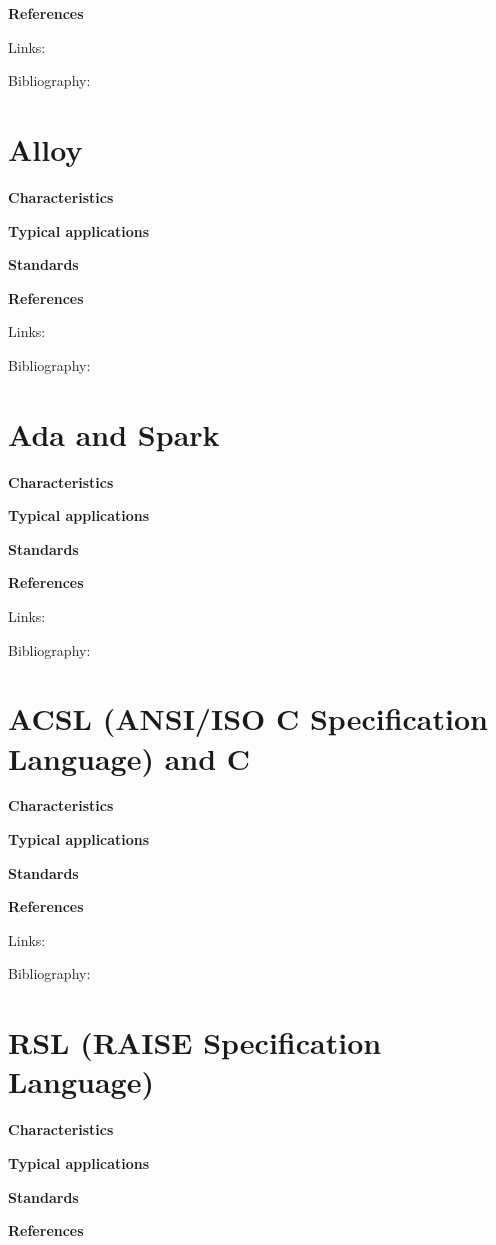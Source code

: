 \documentclass{./template/openetcs2}
\begin{document}
	\textbf{References}

Links:



Bibliography:

\section{Alloy}


	\textbf{Characteristics}


	\textbf{Typical applications}


	\textbf{Standards}


	\textbf{References}

Links:



Bibliography:

\section{Ada and Spark}


	\textbf{Characteristics}


	\textbf{Typical applications}


	\textbf{Standards}


	\textbf{References}

Links:



Bibliography:

\section{ACSL (ANSI/ISO C Specification Language) and C}


	\textbf{Characteristics}


	\textbf{Typical applications}


	\textbf{Standards}


	\textbf{References}

Links:



Bibliography:

\section {RSL (RAISE Specification Language)}


	\textbf{Characteristics}


	\textbf{Typical applications}


	\textbf{Standards}


	\textbf{References}
\end{document}
